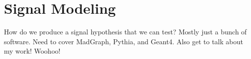 \chapter{Signal Modeling}

How do we produce a signal hypothesis that we can test?
Mostly just a bunch of software.
Need to cover MadGraph, Pythia, and Geant4.
Also get to talk about my work! Woohoo!
